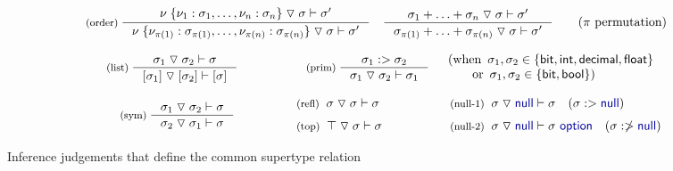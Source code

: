 \documentclass[preprint]{sigplanconf}
\newcommand{\kvd}[1]{\textnormal{\textcolor{kvdclr}{\sffamily #1}}}
\newcommand{\ident}[1]{\textnormal{\sffamily #1}}
\newcommand{\tsep}[0]{\; \triangledown \;}
\begin{document}
\begin{figure}[t]
\begin{equation*}
\hspace{2em}
\inference[(order)\;]
  { \nu \; \{ \nu_1 : \sigma_1, \ldots, \nu_n : \sigma_n \} \tsep \sigma \vdash \sigma' }
  { \nu \; \{ \nu_{\pi(1)} : \sigma_{\pi(1)}, \ldots, \nu_{\pi(n)} : \sigma_{\pi(n)} \} \tsep \sigma \vdash \sigma' }
\quad
\inference
  { \sigma_1 + \ldots + \sigma_n \tsep \sigma \vdash \sigma' }
  { \sigma_{\pi(1)} + \ldots + \sigma_{\pi(n)} \tsep \sigma \vdash \sigma' }
\qquad (\pi~\textnormal{permutation})  
\end{equation*}

\begin{equation*}
\hspace{3em}
\inference[(list)\;]
  {\sigma_1 \tsep \sigma_2 \vdash \sigma}
  {[\sigma_1] \tsep [\sigma_2] \vdash [\sigma]}
\qquad\qquad
\inference[(prim)\;]
  {\sigma_1 :> \sigma_2}
  {\sigma_1 \tsep \sigma_2 \vdash \sigma_1}\quad
\begin{array}{l}
  (\textnormal{when}\,~\sigma_1, \sigma_2 \in \{\ident{bit}, \ident{int}, \ident{decimal}, \ident{float} \} \\
   \quad~~\;\textnormal{or}\,~\sigma_1, \sigma_2 \in \{\ident{bit}, \ident{bool} \})
\end{array}   
\end{equation*}

\noindent
\begin{equation*}
\hspace{4.75em}
\inference[(sym)\;]
  {\sigma_1 \tsep \sigma_2 \vdash \sigma}
  {\sigma_2 \tsep \sigma_1 \vdash \sigma}
%
\qquad\quad
\begin{array}{l}
 \textnormal{\footnotesize{(refl)}}\;\; \sigma \tsep \sigma \vdash \sigma\\[0.6em]
 \textnormal{\footnotesize{(top)}}\;\; \top \tsep \sigma \vdash \sigma
\end{array}
%
\qquad\quad 
 \begin{array}{l}
 \textnormal{\footnotesize{(null-1)}}\;\; \sigma \tsep \kvd{null} \vdash \sigma \quad(\sigma :> \kvd{null}) \\[0.6em]
 \textnormal{\footnotesize{(null-2)}}\;\; \sigma \tsep \kvd{null} \vdash \sigma~\kvd{option} \quad(\sigma :\ngtr \kvd{null})
 \end{array}
\end{equation*}

\caption{Inference judgements that define the common supertype relation}
\label{fig:subtyping-cst}
\end{figure}
\end{document}
